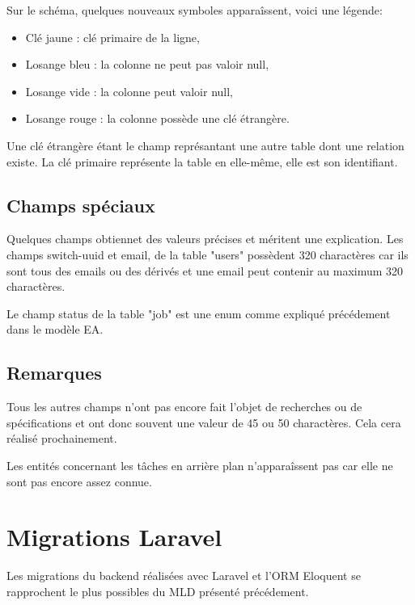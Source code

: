 \documentclass[
    iai, %
    il, %
]{heig-tb}
\begin{document}
Sur le schéma, quelques nouveaux symboles apparaîssent, voici une légende:
\begin{itemize}
    \item Clé jaune : clé primaire de la ligne,
    \item Losange bleu : la colonne ne peut pas valoir null,
    \item Losange vide : la colonne peut valoir null,
    \item Losange rouge : la colonne possède une clé étrangère.
\end{itemize}

Une clé étrangère étant le champ représantant une autre table dont une relation existe. La clé primaire représente la table en elle-même, elle est son identifiant.

\subsection{Champs spéciaux}
Quelques champs obtiennet des valeurs précises et méritent une explication.\newline
Les champs switch-uuid et email, de la table "users" possèdent 320 charactères car ils sont tous des emails ou des dérivés et une email peut contenir au maximum 320 charactères.

Le champ status de la table "job" est une enum comme expliqué précédement dans le modèle EA.

\subsection{Remarques}
Tous les autres champs n'ont pas encore fait l'objet de recherches ou de spécifications et ont donc souvent une valeur de 45 ou 50 charactères. Cela cera réalisé prochainement.

Les entités concernant les tâches en arrière plan n'apparaîssent pas car elle ne sont pas encore assez connue.



\section{Migrations Laravel}

Les migrations du backend réalisées avec Laravel et l'ORM Eloquent se rapprochent le plus possibles du MLD présenté précédement.
\end{document}
